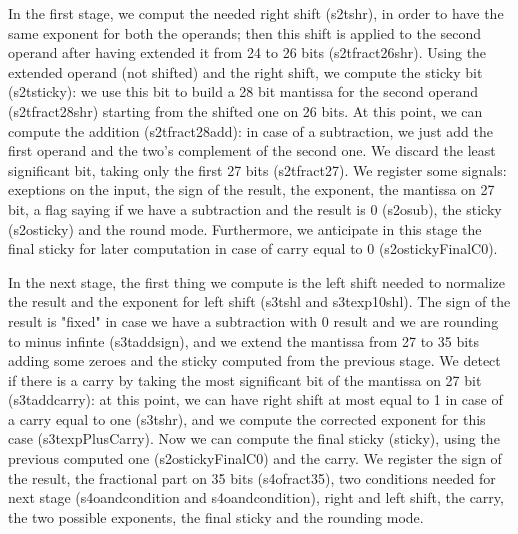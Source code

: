 In the first stage, we comput the needed right shift (s2t\textunderscore shr), in order to have the same exponent for both the operands; then this shift is applied to the second operand after having extended it from 24 to 26 bits (s2t\textunderscore fract26\textunderscore shr). Using the extended operand (not shifted) and the right shift, we compute the sticky bit (s2t\textunderscore sticky): we use this bit to build a 28 bit mantissa for the second operand (s2t\textunderscore fract28\textunderscore shr) starting from the shifted one on 26 bits.
At this point, we can compute the addition (s2t\textunderscore fract28\textunderscore add): in case of a subtraction, we just add the first operand and the two's complement of the second one. We discard the least significant bit, taking only the first 27 bits (s2t\textunderscore fract27).
We register some signals: exeptions on the input, the sign of the result, the exponent, the mantissa on 27 bit, a flag saying if we have a subtraction and the result is 0 (s2o\textunderscore sub), the sticky (s2o\textunderscore sticky) and the round mode. Furthermore, we anticipate in this stage the final sticky for later computation in case of carry equal to 0 (s2o\textunderscore stickyFinalC0).

In the next stage, the first thing we compute is the left shift needed to normalize the result and the exponent for left shift (s3t\textunderscore shl and s3t\textunderscore exp10shl). The sign of the result is "fixed" in case we have a subtraction with 0 result and we are rounding to minus infinte (s3t\textunderscore add\textunderscore sign), and we extend the mantissa from 27 to 35 bits adding some zeroes and the sticky computed from the previous stage. We detect if there is a carry by taking the most significant bit of the mantissa on 27 bit (s3t\textunderscore add\textunderscore carry): at this point, we can have right shift at most equal to 1 in case of a carry equal to one (s3t\textunderscore shr), and we compute the corrected exponent for this case (s3t\textunderscore expPlusCarry). Now we can compute the final sticky (sticky), using the previous computed one (s2o\textunderscore stickyFinalC0) and the carry.
We register the sign of the result, the fractional part on 35 bits (s4o\textunderscore fract35), two conditions needed for next stage (s4o\textunderscore and\textunderscore condition and s4o\textunderscore and\textunderscore condition), right and left shift, the carry, the two possible exponents, the final sticky and the rounding mode.

